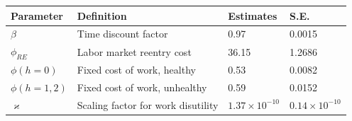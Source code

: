 
    
    \begin{tabular}{p{2.7cm} p{5.57cm} p{2.77cm} p{2.07cm}} %
    \toprule
        \hline
Parameter & Definition & Estimates & S.E.\\[0.5ex]
 \hline





$\beta$ &Time discount factor		&
0.97     & 0.0015 \\
$\phi_{RE}$& Labor market reentry cost		& 
36.15  &1.2686\\
$\phi(h=0)$& Fixed cost of work, healthy 		& 0.53     &0.0082 \\
$\phi(h=1,2)$& Fixed cost of work, unhealthy 	& 0.59 		& 0.0152	\\
$\varkappa$ & Scaling factor for work disutility &$1.37\times 10^{-10}$ & $0.14\times 10^{-10}$\\[0.5ex]
 \hline
 \bottomrule
    \end{tabular}

	


